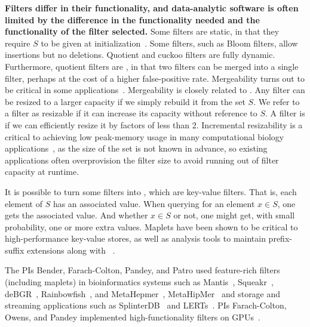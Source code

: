 \noindent
\textbf{Filters differ in their functionality, and data-analytic software is often limited by the difference in the functionality needed and the functionality of the filter selected.}
Some filters are static, in that they require $S$ to be given at initialization~\cite{GrafLe20,DillingerW21}.  Some filters, such as Bloom filters, allow insertions but no deletions.  Quotient and cuckoo filters are fully dynamic.  Furthermore, quotient filters are , in that two filters can be merged into a single filter, perhaps at the cost of a higher false-positive rate.  Mergeability turns out to be critical in some applications~\cite{conway2020splinterdb,PandeyAlBe18}. Mergeability is closely related to .  Any filter can be resized to a larger capacity if we  simply rebuild it from the set $S$.  We refer to a filter as resizable if it can increase its capacity without reference to $S$.  A filter is  if we can efficiently resize it by factors of less than 2.  Incremental resizability is a critical to achieving low peak-memory usage in many computational biology applications~\cite{hofmeyr2020terabase,PandeyBJP17,MarccaisKi11,wood2014kraken,wood2019improved}, as the size of the set is not known in advance, so existing applications often overprovision the filter size to avoid running out of filter capacity at runtime.




It is possible to turn some filters into , which are key-value filters.  That is, each element of $S$ has an associated value.  When querying for an element $x\in S$, one gets the associated value.  And whether $x\in S$ or not, one might get, with small probability, one or more extra values.  Maplets have been shown to be  critical to high-performance key-value stores, as well as \kmer analysis tools to maintain prefix-suffix extensions along with \kmers~\cite{GeorganasEHG18}. 

The PIs Bender, Farach-Colton, Pandey, and Patro used feature-rich filters (including maplets) in bioinformatics systems such as Mantis~\cite{PandeyAlBe18}, Squeakr~\cite{PandeyBeJo18}, deBGR~\cite{PandeyBeJo17b}, Rainbowfish~\cite{AlmodaresiPaPa17}, and MetaHepmer~\cite{mccoy2022high}, MetaHipMer~\cite{McCoyHYP23a} and storage and streaming applications such as SplinterDB~\cite{conway2020splinterdb} and LERTs~\cite{PandeySiBe20}.
PIs Farach-Colton, Owens, and Pandey implemented high-functionality filters on GPUs~\cite{mccoy2022high, McCoyHYP23a, GeilFO18}. 

